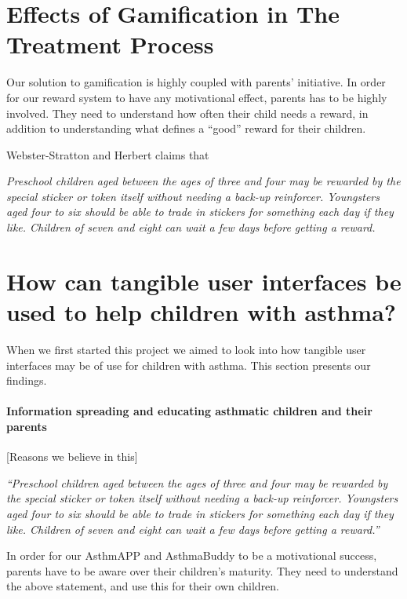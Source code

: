 \section{Effects of Gamification in The Treatment Process}
Our solution to gamification is highly coupled with parents' initiative. In order for our reward system to have any motivational effect, parents has to be highly involved. They need to understand how often their child needs a reward, in addition to understanding what defines a ``good'' reward for their children. 

Webster-Stratton and Herbert claims that


\textit{Preschool children aged between the ages of three and four may be rewarded by the special sticker or token itself without needing a back-up reinforcer. Youngsters aged four to six should be able to trade in stickers for something each day if they like. Children of seven and eight can wait a few days before getting a reward. } \cite{webster1994troubled}


\section{How can tangible user interfaces be used to help children with asthma?}
When we first started this project we aimed to look into how tangible user interfaces may be of use for children with asthma. This section presents our findings.


\paragraph{Information spreading and educating asthmatic children and their parents}
[Reasons we believe in this]

\textit{``Preschool children aged between the ages of three and four may be rewarded by the special sticker or token itself without needing a back-up reinforcer. Youngsters aged four to six should be able to trade in stickers for something each day if they like. Children of seven and eight can wait a few days before getting a reward.''} \cite{webster1994troubled}

In order for our AsthmAPP and AsthmaBuddy to be a motivational success, parents have to be aware over their children's maturity. They need to understand the above statement, and use this for their own children. 
